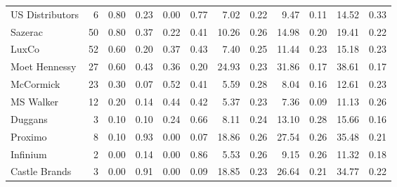 \begin{tabular}{lrrrrrrrrrrr}
US Distributors & 6 & 0.80 & 0.23 & 0.00 & 0.77 & 7.02 & 0.22 & 9.47 & 0.11 & 14.52 & 0.33 \\
Sazerac & 50 & 0.80 & 0.37 & 0.22 & 0.41 & 10.26 & 0.26 & 14.98 & 0.20 & 19.41 & 0.22 \\
LuxCo & 52 & 0.60 & 0.20 & 0.37 & 0.43 & 7.40 & 0.25 & 11.44 & 0.23 & 15.18 & 0.23 \\
Moet Hennessy & 27 & 0.60 & 0.43 & 0.36 & 0.20 & 24.93 & 0.23 & 31.86 & 0.17 & 38.61 & 0.17 \\
McCormick & 23 & 0.30 & 0.07 & 0.52 & 0.41 & 5.59 & 0.28 & 8.04 & 0.16 & 12.61 & 0.23 \\
MS Walker & 12 & 0.20 & 0.14 & 0.44 & 0.42 & 5.37 & 0.23 & 7.36 & 0.09 & 11.13 & 0.26 \\
Duggans & 3 & 0.10 & 0.10 & 0.24 & 0.66 & 8.11 & 0.24 & 13.10 & 0.28 & 15.66 & 0.16 \\
Proximo & 8 & 0.10 & 0.93 & 0.00 & 0.07 & 18.86 & 0.26 & 27.54 & 0.26 & 35.48 & 0.21 \\
Infinium & 2 & 0.00 & 0.14 & 0.00 & 0.86 & 5.53 & 0.26 & 9.15 & 0.26 & 11.32 & 0.18 \\
Castle Brands & 3 & 0.00 & 0.91 & 0.00 & 0.09 & 18.85 & 0.23 & 26.64 & 0.21 & 34.77 & 0.22 \\
\bottomrule
\end{tabular}
